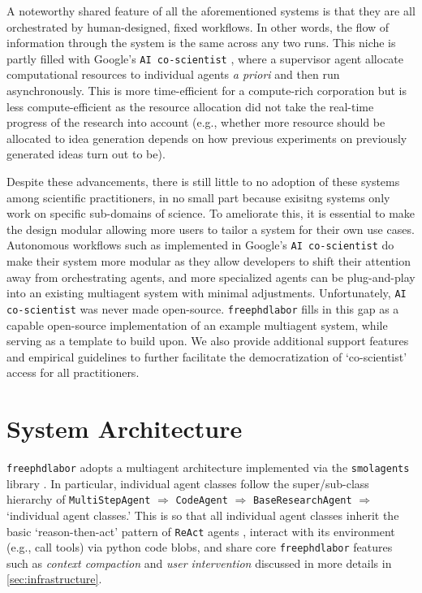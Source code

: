 \documentclass{article}
\begin{document}
A noteworthy shared feature of all the aforementioned systems is that they are all orchestrated by human-designed, fixed workflows. In other words, the flow of information through the system is the same across any two runs. This niche is partly filled with Google's \texttt{AI co-scientist} \cite{gottweisAICoscientist2025a}, where a supervisor agent allocate computational resources to individual agents \textit{a priori} and then run asynchronously. This is more time-efficient for a compute-rich corporation but is less compute-efficient as the resource allocation did not take the real-time progress of the research into account (e.g., whether more resource should be allocated to idea generation depends on how previous experiments on previously generated ideas turn out to be).

Despite these advancements, there is still little to no adoption of these systems among scientific practitioners, in no small part because exisitng systems only work on specific sub-domains of science. To ameliorate this, it is essential to make the design modular allowing more users to tailor a system for their own use cases. Autonomous workflows such as implemented in Google's \texttt{AI co-scientist} do make their system more modular as they allow developers to shift their attention away from orchestrating agents, and more specialized agents can be plug-and-play into an existing multiagent system with minimal adjustments. Unfortunately, \texttt{AI co-scientist} was never made open-source. \texttt{freephdlabor} fills in this gap as a capable open-source implementation of an example multiagent system, while serving as a template to build upon. We also provide additional support features and empirical guidelines to further facilitate the democratization of `co-scientist' access for all practitioners.

\section{System Architecture}
\label{sec:architecture}

\texttt{freephdlabor} adopts a multiagent architecture implemented via the \texttt{smolagents} library \cite{smolagents}. In particular, individual agent classes follow the super/sub-class hierarchy of \texttt{MultiStepAgent} $\Longrightarrow$ \texttt{CodeAgent} $\Longrightarrow$ \texttt{BaseResearchAgent} $\Longrightarrow$ `individual agent classes.' This is so that all individual agent classes inherit the basic `reason-then-act' pattern of \texttt{ReAct} agents \cite{yao2023reactsynergizingreasoningacting}, interact with its environment (e.g., call tools) via python code blobs, and share core \texttt{freephdlabor} features such as \textit{context compaction} and \textit{user intervention} discussed in more details in \cref{sec:infrastructure}.
\end{document}
